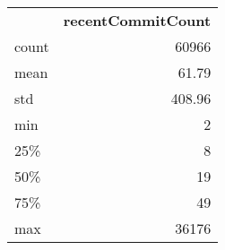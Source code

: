 \begin{tabular}{lr}
 & \textbf{recentCommitCount} \\
count & 60966 \\
mean & 61.79 \\
std & 408.96 \\
min & 2 \\
25\% & 8 \\
50\% & 19 \\
75\% & 49 \\
max & 36176 \\
\end{tabular}
